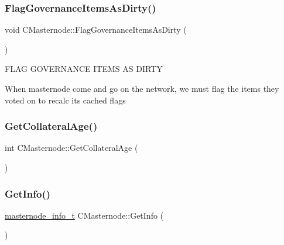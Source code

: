 \subsubsection{\texorpdfstring{Flag\+Governance\+Items\+As\+Dirty()}{FlagGovernanceItemsAsDirty()}}
{\footnotesize\ttfamily void C\+Masternode\+::\+Flag\+Governance\+Items\+As\+Dirty (\begin{DoxyParamCaption}{ }\end{DoxyParamCaption})}

F\+L\+AG G\+O\+V\+E\+R\+N\+A\+N\+CE I\+T\+E\+MS AS D\+I\+R\+TY


\begin{DoxyItemize}
\item When masternode come and go on the network, we must flag the items they voted on to recalc it\textquotesingle{}s cached flags 
\end{DoxyItemize}\mbox{\label{class_c_masternode_a39de7f9e7c2485dd341f7b7bcaa5def6}} 
\subsubsection{\texorpdfstring{Get\+Collateral\+Age()}{GetCollateralAge()}}
{\footnotesize\ttfamily int C\+Masternode\+::\+Get\+Collateral\+Age (\begin{DoxyParamCaption}{ }\end{DoxyParamCaption})}

\mbox{\label{class_c_masternode_a9b6912ac2d8ee011aba8837cb85ada63}} 
\subsubsection{\texorpdfstring{Get\+Info()}{GetInfo()}}
{\footnotesize\ttfamily \mbox{\hyperlink{structmasternode__info__t}{masternode\+\_\+info\+\_\+t}} C\+Masternode\+::\+Get\+Info (\begin{DoxyParamCaption}{ }\end{DoxyParamCaption})}

\mbox{\label{class_c_masternode_ad848b2f168fca83dbc50c4fb07d12868}} 
